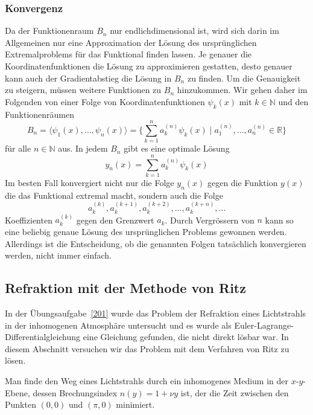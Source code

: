 \subsubsection{Konvergenz}
Da der Funktionenraum $B_n$ nur endlichdimensional ist, wird sich darin
im Allgemeinen nur eine Approximation der Lösung des ursprünglichen
Extremalproblems für das Funktional finden lassen.
Je genauer die Koordinatenfunktionen die Lösung zu approximieren gestatten,
desto genauer kann auch der Gradientabstieg die Lösung in $B_n$ zu finden.
Um die Genauigkeit zu steigern, müssen weitere Funktionen zu $B_n$ hinzukommen.
Wir gehen daher im Folgenden von einer Folge von Koordinatenfunktionen
$\psi_k(x)$ mit $k\in \mathbb{N}$ und den Funktionenräumen
\[
B_n
=
\langle \psi_1(x),\dots,\psi_n(x)\rangle
=
\biggl\{
\sum_{k=1}^n a_k^{(n)} \psi_k(x)
\;
\bigg|
\;
a_1^{(n)},\dots,a_n^{(n)}\in\mathbb{R}
\biggr\}
\]
für alle $n\in\mathbb{N}$ aus.
In jedem $B_n$ gibt es eine optimale Lösung
\[
y_n(x)
=
\sum_{k=1}^n a_k^{(n)} \psi_k(x)
\]
Im besten Fall konvergiert nicht nur die Folge $y_n(x)$ gegen die
Funktion $y(x)$ die das Funktional extremal macht, sondern auch
die Folge
\[
a_k^{(k)},
a_k^{(k+1)},
a_k^{(k+2)},
\dots,
a_k^{(k+n)},
\dots
\]
Koeffizienten $a_k^{(k)}$ gegen den Grenzwert $a_k$.
Durch Vergrössern von $n$ kann so eine beliebig genaue Lösung des
ursprünglichen Problems gewonnen werden.
Allerdings ist die Entscheidung, ob die genannten Folgen tatsächlich
konvergieren werden, nicht immer einfach.

%
%
\subsection{Refraktion mit der Methode von Ritz
\label{buch:direkt:ritz:subsection:refraktion}}
In der Übungsaufgabe~\ref{201} wurde das Problem der Refraktion eines
Lichtstrahls in der inhomogenen Atmosphäre untersucht und es wurde als
Euler-Lagrange-Differentialgleichung eine Gleichung gefunden, die nicht
direkt lösbar war.
In diesem Abschnitt versuchen wir das Problem mit dem Verfahren von Ritz
zu lösen.

\begin{aufgabe}
Man finde den Weg eines Lichtstrahls durch ein inhomogenes Medium
in der $x$-$y$-Ebene,
dessen Brechungsindex $n(y)=1+\nu y$ ist, der die Zeit zwischen
den Punkten $(0,0)$ und $(\pi,0)$ minimiert.
\end{aufgabe}

